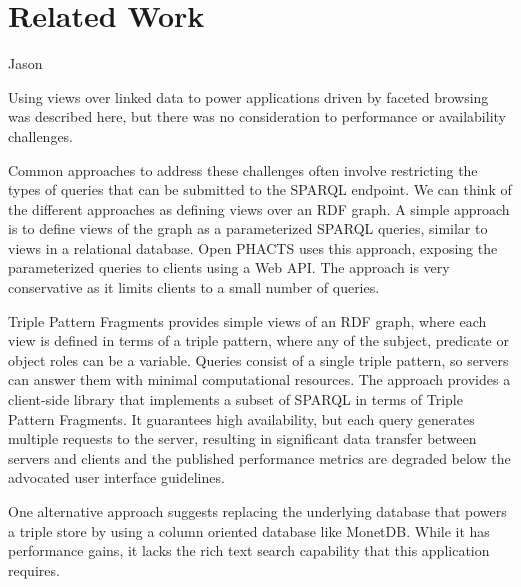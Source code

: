 \section{Related Work}
\label{sec:related-work}
Jason


Using views over linked data to power applications driven by faceted browsing was described here\cite{erling2009faceted}, but there was no consideration to performance or availability challenges. 

Common approaches to address these challenges often involve restricting the types of queries that can be submitted to the SPARQL endpoint.
We can think of the different approaches as defining views over an RDF graph.
A simple approach is to define views of the graph as a parameterized SPARQL queries, similar to views in a relational database.
Open PHACTS\cite{Loizou_Angles_Groth_2014} uses this approach, exposing the parameterized queries to clients using a Web API.
The approach is very conservative as it limits clients to a small number of queries.

Triple Pattern Fragments \cite{Verborgh2014} provides simple views of an RDF graph, where each view is defined in terms of a triple pattern, where any of the subject, predicate or object roles can be a variable.
Queries consist of a single triple pattern, so servers can answer them with minimal computational resources.
The approach provides a client-side library that implements a subset of SPARQL in terms of Triple Pattern Fragments.
It guarantees high availability, but each query generates multiple requests to the server, resulting in significant data transfer between servers and clients and the published performance metrics are degraded below the advocated user interface guidelines. 

One alternative approach suggests replacing the underlying database that powers a triple store by using a column oriented database like MonetDB\cite{Wang_Wang_Du_Feng_2010}.   While it has performance gains, it lacks the rich text search capability that this application requires.